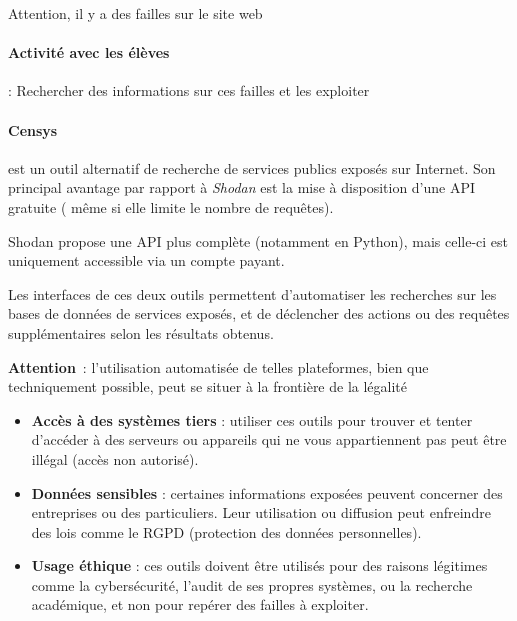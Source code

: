\documentclass[french, 12pt]{article}%
\newcommand{\itemE}{\item[$\bullet$]}
\begin{document}
Attention, il y a des failles sur le site web

\paragraph{Activité avec les élèves } : Rechercher des informations sur ces failles et les exploiter


\vspace{0.5cm}

\paragraph{Censys} est un outil alternatif de recherche de services publics exposés sur Internet. Son principal avantage par rapport à \textit{Shodan} est la mise à disposition d'une API gratuite ( même si elle limite le nombre de requêtes). 

Shodan propose une API plus complète (notamment en Python), mais celle-ci est uniquement accessible via un compte payant. 

Les interfaces de ces deux outils permettent d'automatiser les recherches sur les bases de données de services exposés, et de déclencher des actions ou des requêtes supplémentaires selon les résultats obtenus.

\textbf{Attention}~: l'utilisation automatisée de telles plateformes, bien que techniquement possible, peut se situer à la frontière de la légalité 

\begin{itemize}
     
    \itemE \textbf{Accès à des systèmes tiers} : utiliser ces outils pour trouver et tenter d'accéder à des serveurs ou appareils qui ne vous appartiennent pas peut être illégal (accès non autorisé).
    
    \itemE \textbf{Données sensibles} : certaines informations exposées peuvent concerner des entreprises ou des particuliers. Leur utilisation ou diffusion peut enfreindre des lois comme le RGPD (protection des données personnelles).
    
    \itemE \textbf{Usage éthique} : ces outils doivent être utilisés pour des raisons légitimes comme la cybersécurité, l'audit de ses propres systèmes, ou la recherche académique, et non pour repérer des failles à exploiter.
\end{itemize}
\end{document}
